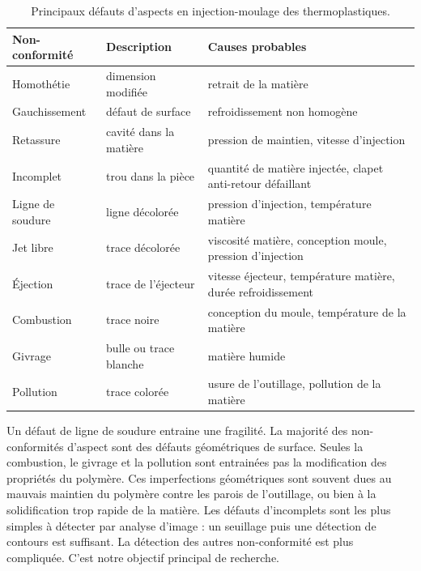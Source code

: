 \begin{table}[htbp]
	\hspace*{-1mm}
	\begin{tabular}{|l|l|l|}
		\arrayrulecolor{black}
		\hline
		Non-conformité & Description & Causes probables \\ \hline \hline
		Homothétie & dimension modifiée & retrait de la matière \\ \hline
		Gauchissement & défaut de surface & refroidissement non homogène \\ \hline
		Retassure  & cavité dans la matière & pression de maintien, vitesse d'injection \\ \hline
		Incomplet & trou dans la pièce & quantité de matière injectée, clapet anti-retour défaillant \\ \hline
		Ligne de soudure & ligne décolorée &  pression d'injection, température matière \\ \hline
		Jet libre & trace décolorée & viscosité matière, conception moule, pression d'injection \\ \hline
		Éjection & trace de l'éjecteur & vitesse éjecteur, température matière, durée refroidissement \\ \hline \hline
		Combustion & trace noire & conception du moule, température de la matière \\ \hline
		Givrage & bulle ou trace blanche & matière humide \\ \hline
		Pollution & trace colorée & usure de l'outillage, pollution de la matière \\ \hline
	\end{tabular}
	\caption{Principaux défauts d'aspects en injection-moulage des thermoplastiques.}
	\label{tab:visual_defect}
\end{table}

Un défaut de ligne de soudure entraine une fragilité.
La majorité des non-conformités d'aspect sont des défauts géométriques de surface.
Seules la combustion, le givrage et la pollution sont entrainées pas la modification des propriétés du polymère.
Ces imperfections géométriques sont souvent dues au mauvais maintien du polymère contre les parois de l'outillage, ou bien à la solidification trop rapide de la matière.
Les défauts d'incomplets sont les plus simples à détecter par analyse d'image : un seuillage puis une détection de contours est suffisant.
La détection des autres non-conformité est plus compliquée.
C'est notre objectif principal de recherche.

